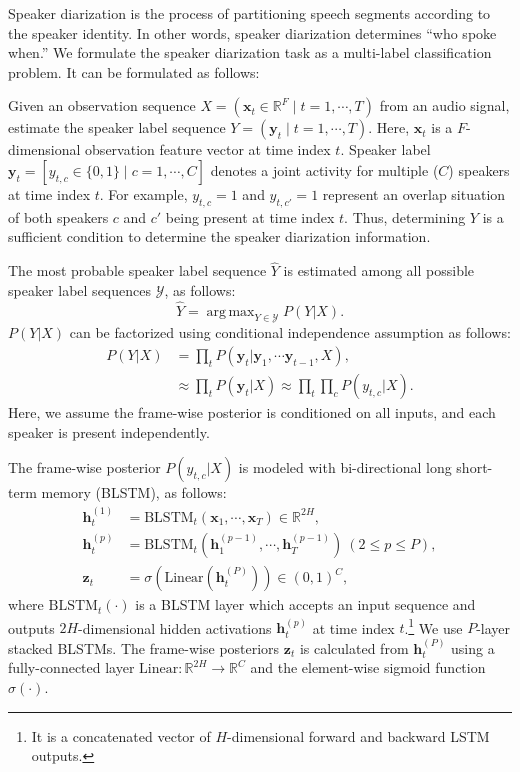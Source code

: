 \documentclass[a4paper]{article}
\renewcommand{\v}[1]{\ensuremath{\mathbf{#1}}}
\DeclareMathOperator*{\argmax}{arg\,max}
\begin{document}
Speaker diarization is the process of partitioning speech segments
according to the speaker identity.
In other words, speaker diarization determines ``who spoke when.''
We formulate the speaker diarization task as a multi-label classification problem.
It can be formulated as follows:

Given an observation sequence $X = (\v{x}_t \in \mathbb{R}^{F} \mid t=1,\cdots,T)$ from an audio signal, estimate the speaker label sequence $Y = (\v{y}_t \mid t=1,\cdots,T)$.
Here, $\v{x}_t$ is a $F$-dimensional observation feature vector at time index $t$.
Speaker label $\v{y}_t = [y_{t,c} \in \{0,1\} \mid c=1, \cdots, C]$ denotes a joint activity for multiple ($C$) speakers at time index $t$.
For example, $y_{t,c} = 1$ and $y_{t,c'} = 1$ represent an overlap situation of both speakers $c$ and $c'$ being present at time index $t$.
Thus, determining $Y$ is a sufficient condition to determine the speaker diarization information.

The most probable speaker label sequence $\hat{Y}$ is estimated
among all possible speaker label sequences $\mathcal{Y}$, as follows:
\begin{equation}
\hat{Y} = \argmax_{Y \in \mathcal{Y}} P(Y|X).
\end{equation}
$P(Y|X)$ can be factorized using conditional independence assumption as follows:
\begin{align}
    P(Y|X) &= \prod_{t} P(\v{y}_t | \v{y}_1, \cdots \v{y}_{t-1}, X), \\
    &\approx \prod_t P(\v{y}_t| X) \approx \prod_t \prod_c P(y_{t,c}| X).
\end{align}
Here, we assume the frame-wise posterior is conditioned
on all inputs, and each speaker is present independently.

The frame-wise posterior $P(y_{t,c}| X)$ is modeled with bi-directional long short-term memory (BLSTM), as follows:
\begin{align}
    \v{h}^{(1)}_t &= \mathrm{BLSTM}_t(\v{x}_1, \cdots, \v{x}_T) \in \mathbb{R}^{2H},\\
    \v{h}^{(p)}_t &= \mathrm{BLSTM}_t(\v{h}^{(p-1)}_1, \cdots, \v{h}^{(p-1)}_T) \  (2 \le  p \le P), \label{eq:hidden} \\
    \v{z}_t  &= \sigma(\mathrm{Linear}(\v{h}^{(P)}_t)) \in (0,1)^C,    \label{eq:out}
\end{align}
where $\mathrm{BLSTM}_t(\cdot)$ is a BLSTM layer which accepts an input sequence and outputs $2H$-dimensional hidden activations $\v{h}_t^{(p)}$ at time index $t$.\footnote{It is a concatenated vector of $H$-dimensional forward and backward LSTM outputs.}
We use $P$-layer stacked BLSTMs.
The frame-wise posteriors $\mathbf{z}_t$ is calculated from $\mathbf{h}_t^{(P)}$ using a fully-connected layer $\mathrm{Linear}:\mathbb{R}^{2H}\rightarrow\mathbb{R}^{C}$ and the element-wise sigmoid function $\sigma\left(\cdot\right)$.
\end{document}
